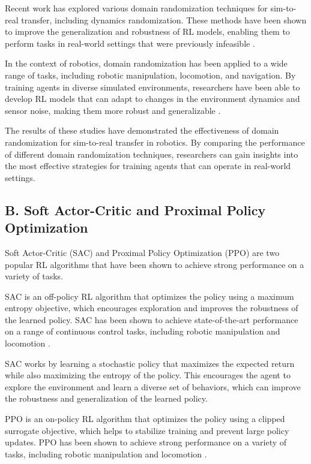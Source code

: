 \documentclass[11pt]{article}
\begin{document}
Recent work has explored various domain randomization techniques for sim-to-real transfer, including dynamics randomization. These methods have been shown to improve the generalization and robustness of RL models, enabling them to perform tasks in real-world settings that were previously infeasible \cite{Peng2018}.

In the context of robotics, domain randomization has been applied to a wide range of tasks, including robotic manipulation, locomotion, and navigation. By training agents in diverse simulated environments, researchers have been able to develop RL models that can adapt to changes in the environment dynamics and sensor noise, making them more robust and generalizable \cite{Kormushev2013, Hofer2020}.

The results of these studies have demonstrated the effectiveness of domain randomization for sim-to-real transfer in robotics. By comparing the performance of different domain randomization techniques, researchers can gain insights into the most effective strategies for training agents that can operate in real-world settings.

\subsection{B. Soft Actor-Critic and Proximal Policy Optimization}

Soft Actor-Critic (SAC) and Proximal Policy Optimization (PPO) are two popular RL algorithms that have been shown to achieve strong performance on a variety of tasks. 

SAC is an off-policy RL algorithm that optimizes the policy using a maximum entropy objective, which encourages exploration and improves the robustness of the learned policy. SAC has been shown to achieve state-of-the-art performance on a range of continuous control tasks, including robotic manipulation and locomotion \cite{Haarnoja2018}.

SAC works by learning a stochastic policy that maximizes the expected return while also maximizing the entropy of the policy. This encourages the agent to explore the environment and learn a diverse set of behaviors, which can improve the robustness and generalization of the learned policy.

PPO is an on-policy RL algorithm that optimizes the policy using a clipped surrogate objective, which helps to stabilize training and prevent large policy updates. PPO has been shown to achieve strong performance on a variety of tasks, including robotic manipulation and locomotion \cite{Schulman2017}.
\end{document}
